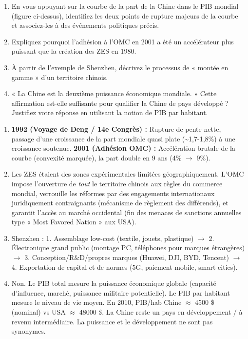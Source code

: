 \documentclass[11pt]{article}
\begin{document}
\begin{exercice}
\begin{enumerate}
    \item En vous appuyant sur la courbe de la part de la Chine dans le PIB mondial (figure ci-dessus), identifiez les deux points de rupture majeurs de la courbe et associez-les à des événements politiques précis.
    \item Expliquez pourquoi l'adhésion à l'OMC en 2001 a été un accélérateur plus puissant que la création des ZES en 1980.
    \item À partir de l'exemple de Shenzhen, décrivez le processus de « montée en gamme » d'un territoire chinois.
    \item « La Chine est la deuxième puissance économique mondiale. » Cette affirmation est-elle suffisante pour qualifier la Chine de pays développé ? Justifiez votre réponse en utilisant la notion de PIB par habitant.
\end{enumerate}
\end{exercice}

\begin{corrige}
\begin{enumerate}
    \item \textbf{1992 (Voyage de Deng / 14e Congrès) :} Rupture de pente nette, passage d'une croissance de la part mondiale quasi plate (\num{~1,7-1,8}\%) à une croissance soutenue. \textbf{2001 (Adhésion OMC) :} Accélération brutale de la courbe (convexité marquée), la part double en 9 ans (\num{4}\% $\to$ \num{9}\%).
    \item Les ZES étaient des zones expérimentales limitées géographiquement. L'OMC impose l'ouverture de \emph{tout} le territoire chinois aux règles du commerce mondial, verrouille les réformes par des engagements internationaux juridiquement contraignants (mécanisme de règlement des différends), et garantit l'accès au marché occidental (fin des menaces de sanctions annuelles type « Most Favored Nation » aux USA).
    \item Shenzhen : 1. Assemblage low-cost (textile, jouets, plastique) $\to$ 2. Électronique grand public (montage PC, téléphones pour marques étrangères) $\to$ 3. Conception/R\&D/propres marques (Huawei, DJI, BYD, Tencent) $\to$ 4. Exportation de capital et de normes (5G, paiement mobile, smart cities).
    \item Non. Le PIB total mesure la puissance économique globale (capacité d'influence, marché, puissance militaire potentielle). Le PIB par habitant mesure le niveau de vie moyen. En 2010, PIB/hab Chine $\approx$ \num{4 500} \$ (nominal) vs USA $\approx$ \num{48 000} \$. La Chine reste un pays en développement / à revenu intermédiaire. La puissance et le développement ne sont pas synonymes.
\end{enumerate}
\end{corrige}
\end{document}
